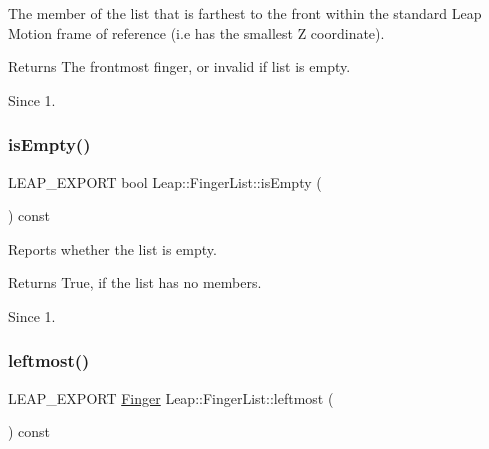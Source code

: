 The member of the list that is farthest to the front within the standard Leap Motion frame of reference (i.\+e has the smallest Z coordinate).


\begin{DoxyCodeInclude}
\end{DoxyCodeInclude}


\begin{DoxyReturn}{Returns}
The frontmost finger, or invalid if list is empty. 
\end{DoxyReturn}
\begin{DoxySince}{Since}
1. 
\end{DoxySince}
\mbox{\label{class_leap_1_1_finger_list_ae1c9c29066daa1e98cc9947799da3802}} 
\subsubsection{\texorpdfstring{is\+Empty()}{isEmpty()}}
{\footnotesize\ttfamily L\+E\+A\+P\+\_\+\+E\+X\+P\+O\+RT bool Leap\+::\+Finger\+List\+::is\+Empty (\begin{DoxyParamCaption}{ }\end{DoxyParamCaption}) const}

Reports whether the list is empty.


\begin{DoxyCodeInclude}
\end{DoxyCodeInclude}


\begin{DoxyReturn}{Returns}
True, if the list has no members. 
\end{DoxyReturn}
\begin{DoxySince}{Since}
1. 
\end{DoxySince}
\mbox{\label{class_leap_1_1_finger_list_ace261bf243a6655c1402ddb3f8f97494}} 
\subsubsection{\texorpdfstring{leftmost()}{leftmost()}}
{\footnotesize\ttfamily L\+E\+A\+P\+\_\+\+E\+X\+P\+O\+RT \hyperlink{class_leap_1_1_finger}{Finger} Leap\+::\+Finger\+List\+::leftmost (\begin{DoxyParamCaption}{ }\end{DoxyParamCaption}) const}

